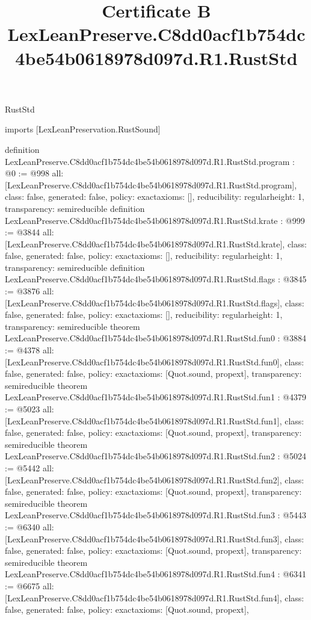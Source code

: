 \begin{lexlean}{RustStd}
\title{Certificate B LexLeanPreserve.C8dd0acf1b754dc4be54b0618978d097d.R1.RustStd}
\begin{coremodule}
imports [LexLeanPreservation.RustSound]

definition LexLeanPreserve.C8dd0acf1b754dc4be54b0618978d097d.R1.RustStd.program : @0 := @998 {
  all: [LexLeanPreserve.C8dd0acf1b754dc4be54b0618978d097d.R1.RustStd.program],
  class: false,
  generated: false,
  policy: exact{axioms: []},
  reducibility: regular{height: 1},
  transparency: semireducible
}
definition LexLeanPreserve.C8dd0acf1b754dc4be54b0618978d097d.R1.RustStd.krate : @999 := @3844 {
  all: [LexLeanPreserve.C8dd0acf1b754dc4be54b0618978d097d.R1.RustStd.krate],
  class: false,
  generated: false,
  policy: exact{axioms: []},
  reducibility: regular{height: 1},
  transparency: semireducible
}
definition LexLeanPreserve.C8dd0acf1b754dc4be54b0618978d097d.R1.RustStd.flags : @3845 := @3876 {
  all: [LexLeanPreserve.C8dd0acf1b754dc4be54b0618978d097d.R1.RustStd.flags],
  class: false,
  generated: false,
  policy: exact{axioms: []},
  reducibility: regular{height: 1},
  transparency: semireducible
}
theorem LexLeanPreserve.C8dd0acf1b754dc4be54b0618978d097d.R1.RustStd.fun0 : @3884 := @4378 {
  all: [LexLeanPreserve.C8dd0acf1b754dc4be54b0618978d097d.R1.RustStd.fun0],
  class: false,
  generated: false,
  policy: exact{axioms: [Quot.sound, propext]},
  transparency: semireducible
}
theorem LexLeanPreserve.C8dd0acf1b754dc4be54b0618978d097d.R1.RustStd.fun1 : @4379 := @5023 {
  all: [LexLeanPreserve.C8dd0acf1b754dc4be54b0618978d097d.R1.RustStd.fun1],
  class: false,
  generated: false,
  policy: exact{axioms: [Quot.sound, propext]},
  transparency: semireducible
}
theorem LexLeanPreserve.C8dd0acf1b754dc4be54b0618978d097d.R1.RustStd.fun2 : @5024 := @5442 {
  all: [LexLeanPreserve.C8dd0acf1b754dc4be54b0618978d097d.R1.RustStd.fun2],
  class: false,
  generated: false,
  policy: exact{axioms: [Quot.sound, propext]},
  transparency: semireducible
}
theorem LexLeanPreserve.C8dd0acf1b754dc4be54b0618978d097d.R1.RustStd.fun3 : @5443 := @6340 {
  all: [LexLeanPreserve.C8dd0acf1b754dc4be54b0618978d097d.R1.RustStd.fun3],
  class: false,
  generated: false,
  policy: exact{axioms: [Quot.sound, propext]},
  transparency: semireducible
}
theorem LexLeanPreserve.C8dd0acf1b754dc4be54b0618978d097d.R1.RustStd.fun4 : @6341 := @6675 {
  all: [LexLeanPreserve.C8dd0acf1b754dc4be54b0618978d097d.R1.RustStd.fun4],
  class: false,
  generated: false,
  policy: exact{axioms: [Quot.sound, propext]},
}
\end{coremodule}
\end{lexlean}
